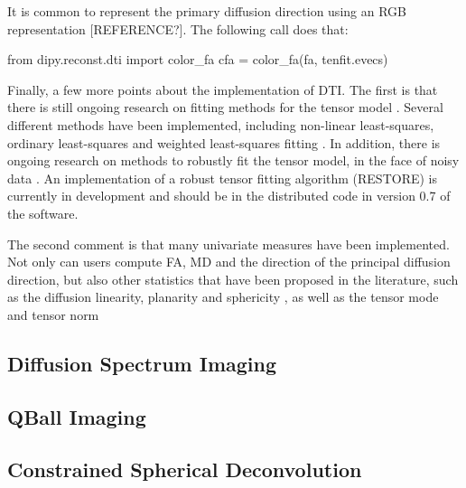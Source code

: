 \documentclass{bioinfo}
\begin{document}
It is common to represent the primary diffusion direction using an RGB representation [REFERENCE?]. The following call does that:
 
\begin{python}
from dipy.reconst.dti import color_fa
cfa = color_fa(fa, tenfit.evecs)
\end{python}

Finally, a few more points about the implementation of DTI. The first is that there is still ongoing research on fitting methods for the tensor model \citep{Koay2006}. Several different methods have been implemented, including non-linear least-squares, ordinary least-squares and weighted least-squares fitting \citep{chung-lu-etal:06}. In addition, there is ongoing research on methods to robustly fit the tensor model, in the face of noisy data \citep{Chang2005, Chang2012}. An implementation of a robust tensor fitting algorithm (RESTORE) is currently in development and should be in the distributed code in version 0.7 of the software. 

The second comment is that many univariate measures have been implemented. Not only can users compute FA, MD and the direction of the principal diffusion direction, but also other statistics that have been proposed in the literature, such as the diffusion linearity, planarity and sphericity \citep{westin:97}, as well as the tensor mode and tensor norm \cite{Ennis2006}

\subsection{Diffusion Spectrum Imaging}

\subsection{QBall Imaging}

\subsection{Constrained Spherical Deconvolution} 
\end{document}
